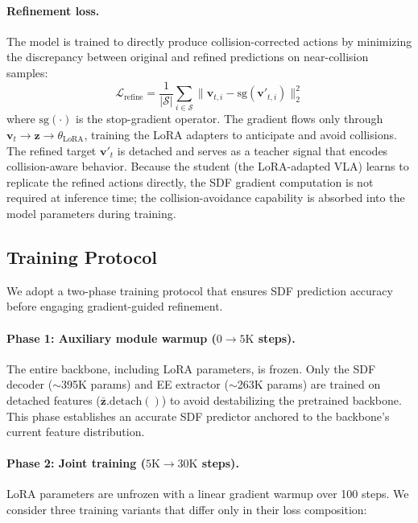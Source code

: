 \paragraph{Refinement loss.} The model is trained to directly produce collision-corrected actions by minimizing the discrepancy between original and refined predictions on near-collision samples:
\begin{equation}\label{eq:loss_refine}
\mathcal{L}_\mathrm{refine} = \frac{1}{|\mathcal{S}|} \sum_{i \in \mathcal{S}} \|\mathbf{v}_{t,i} - \mathrm{sg}(\mathbf{v}'_{t,i})\|_2^2
\end{equation}
where $\mathrm{sg}(\cdot)$ is the stop-gradient operator. The gradient flows only through $\mathbf{v}_t \to \mathbf{z} \to \theta_\mathrm{LoRA}$, training the LoRA adapters to anticipate and avoid collisions. The refined target $\mathbf{v}'_t$ is detached and serves as a teacher signal that encodes collision-aware behavior. Because the student (the LoRA-adapted VLA) learns to replicate the refined actions directly, the SDF gradient computation is not required at inference time; the collision-avoidance capability is absorbed into the model parameters during training.

\subsection{Training Protocol}\label{sec:training}

We adopt a two-phase training protocol that ensures SDF prediction accuracy before engaging gradient-guided refinement.

\paragraph{Phase 1: Auxiliary module warmup ($0 \to 5\mathrm{K}$ steps).} The entire backbone, including LoRA parameters, is frozen. Only the SDF decoder (${\sim}$395K params) and EE extractor (${\sim}$263K params) are trained on detached features ($\bar{\mathbf{z}}.\mathrm{detach}()$) to avoid destabilizing the pretrained backbone. This phase establishes an accurate SDF predictor anchored to the backbone's current feature distribution.

\paragraph{Phase 2: Joint training ($5\mathrm{K} \to 30\mathrm{K}$ steps).} LoRA parameters are unfrozen with a linear gradient warmup over 100 steps. We consider three training variants that differ only in their loss composition:

